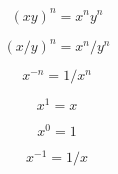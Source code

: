 \[(xy)^{n} = x^{n}y^{n}\]

\[(x/y)^{n} = x^{n}/y^{n}\]

\[x^{-n} = 1/x^{n}\]

\[x^{1} = x\]

\[x^{0} = 1\]

\[x^{-1} = 1/x\]

